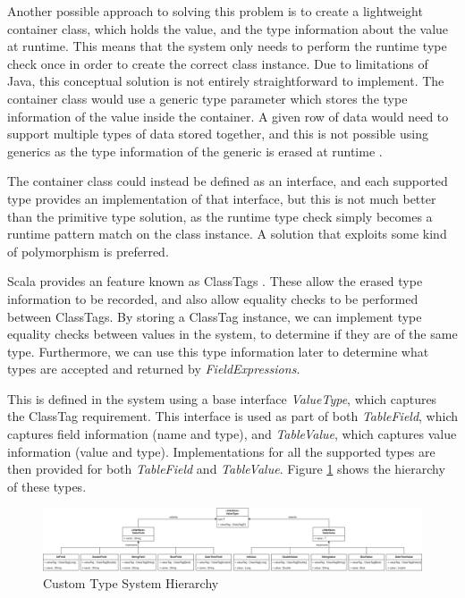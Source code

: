 Another possible approach to solving this problem is to create a lightweight container class, which holds the value, and the type information about the value at runtime. This means that the system only needs to perform the runtime type check once in order to create the correct class instance. Due to limitations of Java, this conceptual solution is not entirely straightforward to implement. The container class would use a generic type parameter which stores the type information of the value inside the container. A given row of data would need to support multiple types of data stored together, and this is not possible using generics as the type information of the generic is erased at runtime \cite{ghosh2004generics}.

The container class could instead be defined as an interface, and each supported type provides an implementation of that interface, but this is not much better than the primitive type solution, as the runtime type check simply becomes a runtime pattern match on the class instance. A solution that exploits some kind of polymorphism is preferred.

Scala provides an feature known as ClassTags \cite{scalaclasstags}. These allow the erased type information to be recorded, and also allow equality checks to be performed between ClassTags. By storing a ClassTag instance, we can implement type equality checks between values in the system, to determine if they are of the same type. Furthermore, we can use this type information later to determine what types are accepted and returned by \textit{FieldExpressions}.

This is defined in the system using a base interface \textit{ValueType}, which captures the ClassTag requirement. This interface is used as part of both \textit{TableField}, which captures field information (name and type), and \textit{TableValue}, which captures value information (value and type). Implementations for all the supported types are then provided for both \textit{TableField} and \textit{TableValue}. Figure \ref{fig:type-system-hierarchy} shows the hierarchy of these types. 

\begin{figure}[h]
	\centering
	\includegraphics[width=\textwidth]{chapters/diagrams/implementation/type-system-hierarchy}
	\caption{Custom Type System Hierarchy}
	\label{fig:type-system-hierarchy}
\end{figure}


